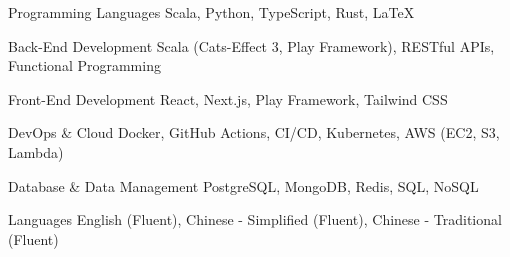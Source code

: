 
\begin{cvskills}

  \cvskill
  {Programming Languages} %
  {Scala, Python, TypeScript, Rust, LaTeX} %

  \cvskill
  {Back-End Development} %
  {Scala (Cats-Effect 3, Play Framework), RESTful APIs, Functional Programming} %

  \cvskill
  {Front-End Development} %
  {React, Next.js, Play Framework, Tailwind CSS} %

  \cvskill
  {DevOps \& Cloud} %
  {Docker, GitHub Actions, CI/CD, Kubernetes, AWS (EC2, S3, Lambda)} %

  \cvskill
  {Database \& Data Management} %
  {PostgreSQL, MongoDB, Redis, SQL, NoSQL} %

  \cvskill
  {Languages} %
  {English (Fluent), Chinese - Simplified (Fluent), Chinese - Traditional (Fluent)} %

\end{cvskills}
